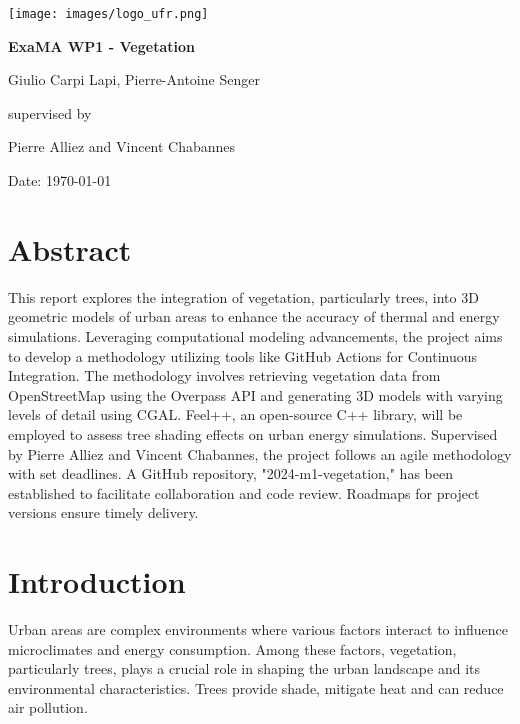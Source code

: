 \documentclass[12pt]{article}
\begin{document}
\begin{titlepage}
    \centering
    \texttt{[image: images/logo\_ufr.png]}\par\vspace{1cm}
    \vspace{1.5cm}
    {\huge\bfseries ExaMA WP1 - Vegetation\par}
    \vspace{2cm}
    {\Large Giulio Carpi Lapi, Pierre-Antoine Senger\par}
    \vfill
    supervised by\par
    Pierre Alliez and Vincent Chabannes

    \vfill

    {\large Date: \today\par}
\end{titlepage}

\tableofcontents
\newpage

\section{Abstract}
This report explores the integration of vegetation, particularly trees, into 
3D geometric models of urban areas to enhance the accuracy of thermal and 
energy simulations. Leveraging computational modeling advancements, the 
project aims to develop a methodology utilizing tools like GitHub Actions 
for Continuous Integration. The methodology involves retrieving vegetation 
data from OpenStreetMap using the Overpass API and generating 3D models with 
varying levels of detail using CGAL. Feel++, an open-source C++ library, 
will be employed to assess tree shading effects on urban energy simulations. 
Supervised by Pierre Alliez and Vincent Chabannes, the project follows an 
agile methodology with set deadlines. A GitHub repository, 
"2024-m1-vegetation," has been established to facilitate collaboration and 
code review. Roadmaps for project versions ensure timely delivery.



\newpage

\section{Introduction}
Urban areas are complex environments where various factors interact to influence 
microclimates and energy consumption. Among these factors, 
vegetation, particularly trees, plays a crucial role in shaping the urban landscape 
and its environmental characteristics. Trees provide shade, mitigate heat and can
reduce air pollution.
\end{document}
